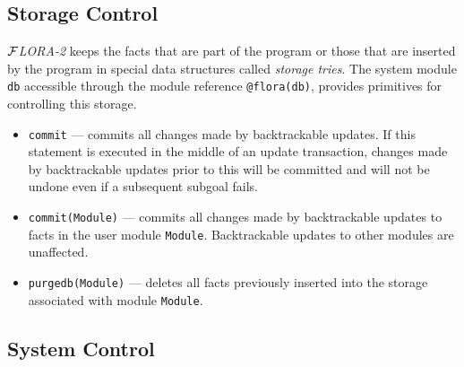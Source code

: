 \documentclass[11pt]{article}
\newcommand{\FLORA}{{\mbox{${\cal F}${\small\it LORA}\rm\emph{-2}}}\xspace}
\begin{document}
\subsection{Storage Control}\label{sec:storage-ctl}

\FLORA keeps the facts that are part of the program or those that are
inserted by the program in special data structures called \emph{storage
  tries}.  The system module {\tt db} accessible through the module
reference {\tt @flora(db)}, provides primitives for controlling this
storage.
\begin{itemize}
  \item  {\tt commit} --- commits all changes made by backtrackable updates.
    If this statement is executed in the middle of an update transaction,
    changes made by backtrackable updates prior to this will be committed
    and will not be undone even if a subsequent subgoal fails.
  \item {\tt commit(Module)} --- commits all changes made by backtrackable
    updates to facts in the user module {\tt Module}. Backtrackable updates
    to other modules are unaffected.
  \item {\tt purgedb(Module)} --- deletes all facts previously inserted
    into the storage associated with module {\tt Module}.
\end{itemize}

\subsection{System Control}
\end{document}
